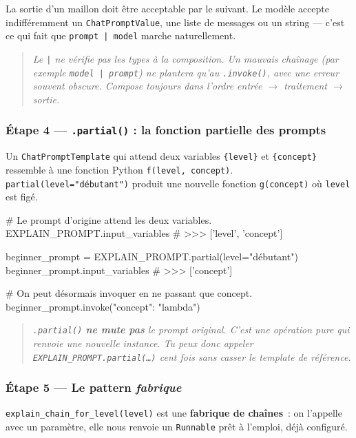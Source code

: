 \documentclass[11pt,a4paper]{article}
\begin{document}
La sortie d'un maillon doit être acceptable par le suivant. Le modèle
accepte indifféremment un \texttt{ChatPromptValue}, une liste de messages
ou un string — c'est ce qui fait que \texttt{prompt | model} marche
naturellement.

\begin{quote}\itshape
Le \texttt{|} ne vérifie pas les types à la composition. Un mauvais
chaînage (par exemple \texttt{model | prompt}) ne plantera qu'au
\texttt{.invoke()}, avec une erreur souvent obscure. Compose toujours dans
l'ordre \emph{entrée $\to$ traitement $\to$ sortie}.
\end{quote}

\subsubsection*{Étape 4 — \texttt{.partial()} : la fonction partielle des prompts}

Un \texttt{ChatPromptTemplate} qui attend deux variables \texttt{\{level\}}
et \texttt{\{concept\}} ressemble à une fonction Python \texttt{f(level,
concept)}. \texttt{partial(level="débutant")} produit une nouvelle
fonction \texttt{g(concept)} où \texttt{level} est figé.

\begin{pythoncode}
# Le prompt d'origine attend les deux variables.
EXPLAIN_PROMPT.input_variables
# >>> ['level', 'concept']

beginner_prompt = EXPLAIN_PROMPT.partial(level="débutant")
beginner_prompt.input_variables
# >>> ['concept']

# On peut désormais invoquer en ne passant que {concept}.
beginner_prompt.invoke({"concept": "lambda"})
\end{pythoncode}

\begin{quote}\itshape
\texttt{.partial()} \textbf{ne mute pas} le prompt original. C'est une
opération \emph{pure} qui renvoie une nouvelle instance. Tu peux donc
appeler \texttt{EXPLAIN\_PROMPT.partial(\dots)} cent fois sans casser le
template de référence.
\end{quote}

\subsubsection*{Étape 5 — Le pattern \emph{fabrique}}

\texttt{explain\_chain\_for\_level(level)} est une \textbf{fabrique de
chaînes}~: on l'appelle avec un paramètre, elle nous renvoie un
\texttt{Runnable} prêt à l'emploi, déjà configuré.
\end{document}
